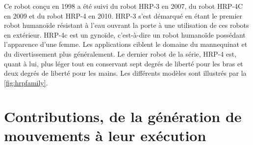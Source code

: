 Ce robot conçu en 1998 a été suivi du robot HRP-3 en 2007, du robot
HRP-4C en 2009 et du robot HRP-4 en 2010. HRP-3 s'est démarqué en
étant le premier robot humanoïde résistant à l'eau ouvrant la porte à
une utilisation de ces robots en extérieur. HRP-4c est un gynoïde,
c'est-à-dire un robot humanoïde possédant l'apparence d'une femme. Les
applications ciblent le domaine du mannequinat et du divertissement
plus généralement. Le dernier robot de la série, HRP-4 est, quant à
lui, plus léger tout en conservant sept degrés de liberté pour les
bras et deux degrés de liberté pour les mains. Les différents modèles
sont illustrés par la \autoref{fig:hrpfamily}.


\section[Contributions]{Contributions, de la génération de mouvements à leur exécution}


